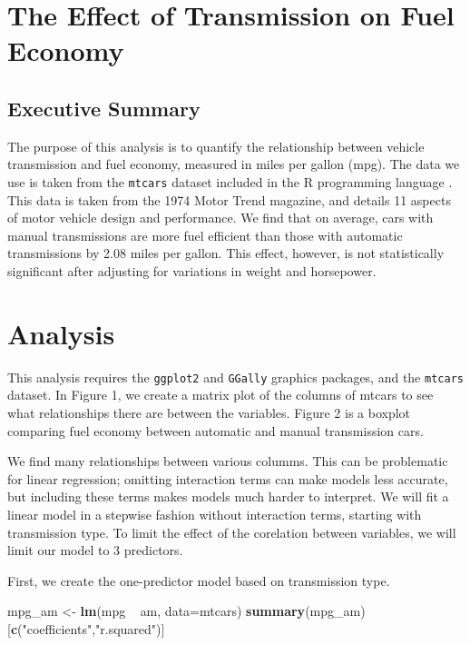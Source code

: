 \documentclass[]{article}
\author{}
\date{}
\newenvironment{Shaded}{\begin{snugshade}}{\end{snugshade}}
\newcommand{\KeywordTok}[1]{\textcolor[rgb]{0.13,0.29,0.53}{\textbf{{#1}}}}
\newcommand{\DataTypeTok}[1]{\textcolor[rgb]{0.13,0.29,0.53}{{#1}}}
\newcommand{\StringTok}[1]{\textcolor[rgb]{0.31,0.60,0.02}{{#1}}}
\newcommand{\NormalTok}[1]{{#1}}
\begin{document}
\begin{center}
\normalsize
\end{center}


\section{The Effect of Transmission on Fuel
Economy}\label{the-effect-of-transmission-on-fuel-economy}

\subsection{Executive Summary}\label{executive-summary}

The purpose of this analysis is to quantify the relationship between
vehicle transmission and fuel economy, measured in miles per gallon
(mpg). The data we use is taken from the \texttt{mtcars} dataset
included in the R programming language . This data is taken from the
1974 Motor Trend magazine, and details 11 aspects of motor vehicle
design and performance. We find that on average, cars with manual
transmissions are more fuel efficient than those with automatic
transmissions by 2.08 miles per gallon. This effect, however, is not
statistically significant after adjusting for variations in weight and
horsepower.

\section{Analysis}\label{analysis}

This analysis requires the \texttt{ggplot2} and \texttt{GGally} graphics
packages, and the \texttt{mtcars} dataset. In Figure 1, we create a
matrix plot of the columns of mtcars to see what relationships there are
between the variables. Figure 2 is a boxplot comparing fuel economy
between automatic and manual transmission cars.

We find many relationships between various columms. This can be
problematic for linear regression; omitting interaction terms can make
models less accurate, but including these terms makes models much harder
to interpret. We will fit a linear model in a stepwise fashion without
interaction terms, starting with transmission type. To limit the effect
of the corelation between variables, we will limit our model to 3
predictors.

First, we create the one-predictor model based on transmission type.

\begin{Shaded}
\begin{Highlighting}[]
\NormalTok{mpg_am <-}\StringTok{ }\KeywordTok{lm}\NormalTok{(mpg ~}\StringTok{ }\NormalTok{am, }\DataTypeTok{data=}\NormalTok{mtcars)}
\KeywordTok{summary}\NormalTok{(mpg_am)[}\KeywordTok{c}\NormalTok{(}\StringTok{"coefficients"}\NormalTok{,}\StringTok{"r.squared"}\NormalTok{)]}
\end{Highlighting}
\end{Shaded}
\end{document}
